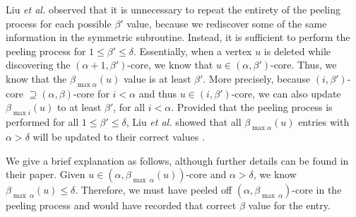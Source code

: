 Liu \textit{et al.} observed that it is unnecessary to repeat the entirety of the peeling process for each possible $\beta'$ value, because we rediscover some of the same information in the symmetric subroutine. Instead, it is sufficient to perform the peeling process for $1\le\beta'\le\delta$. Essentially, when a vertex $u$ is deleted while discovering the $(\alpha + 1, \beta')$-core, we know that $u\in (\alpha,\beta')$-core.
Thus, we know that the $\beta_{\max \alpha}(u)$ value is at least $\beta'$. More precisely, because $(i,\beta')$-core $\supseteq (\alpha,\beta)$-core for $i< \alpha$ and thus $u\in (i, \beta')$-core, we can also update $\beta_{\max i}(u)$ to at least $\beta'$, for all $i<\alpha$. Provided that the peeling process is performed for all $1\le\beta'\le \delta$, Liu \textit{et al.} showed that all $\beta_{\max \alpha}(u)$ entries with $\alpha > \delta$ will be updated to their correct values \cite{Liu2020Efficient}.

We give a brief explanation as follows, although further details can be found in their paper. Given $u\in (\alpha,\beta_{\max\ \alpha}(u))$-core and $\alpha>\delta$, we know $\beta_{\max\ \alpha}(u)\le \delta$. Therefore, we must have peeled off $(\alpha,\beta_{\max\ \alpha})$-core in the peeling process and would have recorded that correct $\beta$ value for the entry.


